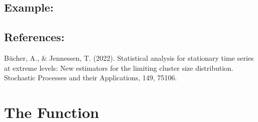 \documentclass[a4paper,11pt,openany,english]{sphinxmanual}
\begin{document}
\begin{fulllineitems}
\subsection{Example:}
\label{\detokenize{api_biascorrection:example}}
\begin{sphinxVerbatim}[commandchars=\\\{\}]
   
 
\end{sphinxVerbatim}


\subsection{References:}
\label{\detokenize{api_biascorrection:references}}
\sphinxAtStartPar
Bücher, A., \& Jennessen, T. (2022). Statistical analysis for stationary time series 
at extreme levels: New estimators for the limiting cluster size distribution. 
Stochastic Processes and their Applications, 149, 75\sphinxhyphen{}106.

\end{fulllineitems}



\section{The  Function}
\label{\detokenize{api_biascorrection:the-d-n-function}}
\end{document}
